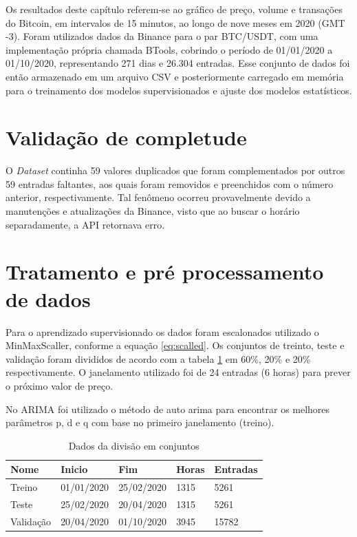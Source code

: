 Os resultados deste capítulo referem-se ao gráfico de preço, volume e transações do Bitcoin, em intervalos de 15 minutos, ao longo de nove meses em 2020 (GMT -3).
Foram utilizados dados da Binance para o par BTC/USDT, com uma implementação própria chamada BTools, cobrindo o período de 01/01/2020 a 01/10/2020, representando 271 dias e 26.304 entradas.
Esse conjunto de dados foi então armazenado em um arquivo CSV e posteriormente carregado em memória para o treinamento dos modelos supervisionados e ajuste dos modelos estatísticos.

\section{Validação de completude}
O \textit{Dataset} continha 59 valores duplicados que foram complementados por outros 59 entradas faltantes, aos quais foram removidos e preenchidos com o número anterior, respectivamente.
Tal fenômeno ocorreu provavelmente devido a manutenções e atualizações da Binance, visto que ao buscar o horário separadamente, a API retornava erro.

\section{Tratamento e pré processamento de dados}
Para o aprendizado supervisionado os dados foram escalonados utilizado o MinMaxScaller, conforme a equação \ref{eq:scalled}. Os conjuntos de treinto, teste e validação foram divididos de acordo com a tabela \ref{tab:conjuntos} em 60\%, 20\% e 20\% respectivamente. 
O janelamento utilizado foi de 24 entradas (6 horas) para prever o próximo valor de preço.

No ARIMA foi utilizado o método de auto arima para encontrar os melhores parâmetros p, d e q com base no primeiro janelamento (treino).

\begin{table}[!htb]
    \caption{Dados da divisão em conjuntos} \label{tab:conjuntos}
    \begin{tabularx}{\textwidth}{X|X|X|X|X}
    \hline
    Nome & Inicio & Fim & Horas & Entradas \\ \hline
    Treino   & 01/01/2020      & 25/02/2020            & 1315      & 5261          \\ \hline
    Teste   & 25/02/2020     & 20/04/2020            & 1315     & 5261         \\ \hline
    Validação   & 20/04/2020      & 01/10/2020             & 3945     & 15782         \\ \hline
    \end{tabularx}
\end{table}

